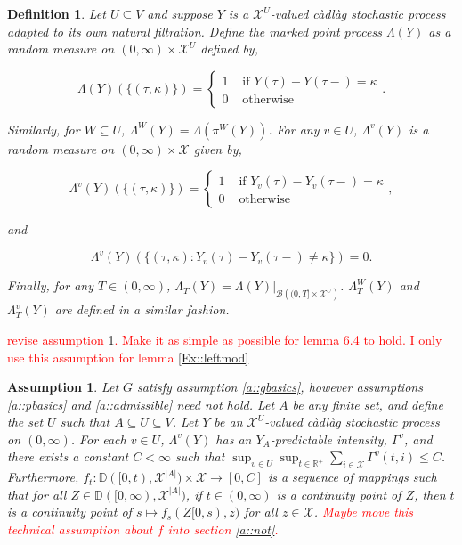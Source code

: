 \documentclass[12pt]{article}
\newcommand{\mb}{\mathbb}
\newcommand{\mc}{\mathcal}
\newcommand{\ms}{\mathscr}
\newcommand{\ra}{\rightarrow}
\newcommand{\te}{\text}
\newcommand{\tr}{\textcolor{red}}
\newcommand{\ind}{\hspace{24pt}}
\newcommand{\cad}{\mb{D}}							%
\newcommand{\sta}{\mc{X}}							%
\newcommand{\proj}{\pi}								%
\newcommand{\vind}[1]{_{#1}}						%
\newcommand{\tme}[1]{(#1)}							%
\newcommand{\tmi}[1]{#1}							%
\newcommand{\vpara}[1]{^{#1}}						%
\newcommand{\tpara}[1]{_{#1}}						%
\newcommand{\Xg}{Y}									%
\newcommand{\pmap}{\Lambda}							%
\newcommand{\rt}{\tau}								%
\renewcommand{\mark}{\kappa}						%
\newcommand{\ratee}{\Gamma}							%
\newcommand{\Xh}{Z}									%
\newtheorem{defn}[thms]{Definition}
\newtheorem{assu}{Assumption}
\begin{document}
\begin{defn}
Let \(U\subseteq V\) and suppose \(\Xg\) is a \(\sta^U\)-valued c\`adl\`ag stochastic process adapted to its own natural filtration. Define the marked point process \(\pmap(\Xg)\) as a random measure on \((0,\infty) \times \sta^U\) defined by,

\[\pmap(\Xg)(\{(\rt,\mark)\}) = \begin{cases}
1 &\te{ if } \Xg\tme{\rt} - \Xg\tme{\rt-} = \mark\\
0 &\te{ otherwise}
\end{cases}.\]

Similarly, for \(W \subseteq U\), \(\pmap\vpara{W}(\Xg) = \pmap\left(\proj\vpara{W}(\Xg)\right)\). For any \(v\in U\), \(\pmap\vpara{v}(\Xg)\) is a random measure on \((0,\infty) \times \sta\) given by,

\[\pmap\vpara{v}(\Xg)(\{(\rt,\mark)\}) = \begin{cases}
1 &\te{ if } \Xg\vind{v}\tme{\rt} - \Xg\vind{v}\tme{\rt-} = \mark\\
0 &\te{ otherwise}
\end{cases},\]

and

\[\pmap\vpara{v}(\Xg)(\{(\rt,\mark): \Xg\vind{v}\tme{\rt} - \Xg\vind{v}\tme{\rt-} \neq \mark\}) = 0.\]

Finally, for any \(T\in (0,\infty)\), \(\pmap\tpara{T}(\Xg) = \pmap(\Xg)|_{\ms{B}\left((0,T]\times\sta^U\right)}\). \(\pmap\vpara{W}\tpara{T}(\Xg)\) and \(\pmap\vpara{v}\tpara{T}(\Xg)\) are defined in a similar fashion.
\label{Ex::pmap}
\end{defn}

\ind \tr{revise assumption \ref{Ex::Eassu}. Make it as simple as possible for lemma 6.4 to hold. I only use this assumption for lemma \ref{Ex::leftmod}}

\begin{assu}
Let \(G\) satisfy assumption \ref{a::gbasics}, however assumptions \ref{a::pbasics} and \ref{a::admissible} need not hold. Let \(A\) be any finite set, and define the set \(U\) such that \(A\subseteq U \subseteq V\). Let \(\Xg\) be an \(\sta^U\)-valued c\`adl\`ag stochastic process on \((0,\infty)\). For each \(v\in U\), \(\pmap\vpara{v}(\Xg)\) has an \(\Xg\vind{A}\)-predictable intensity, \(\ratee\vpara{v}\), and there exists a constant \(C < \infty\) such that \(\sup_{v\in U}\sup_{t\in \mb{R}^+}\sum_{i \in \sta} \ratee\vpara{v}(t,i) \leq C\). Furthermore, \(f\tpara{t}: \cad([0,t),\sta^{|A|})\times \sta\ra[0,C]\) is a sequence of mappings such that for all \(\Xh \in \cad([0,\infty),\sta^{|A|})\), if \(t\in (0,\infty)\) is a continuity point of \(\Xh\), then \(t\) is a continuity point of \(s \mapsto f\tpara{s}(\Xh\tmi{[0,s)},z)\) for all \(z \in \sta\). \tr{Maybe move this technical assumption about \(f\) into section \ref{a::not}.}
\label{Ex::Eassu}
\end{assu}
\end{document}
